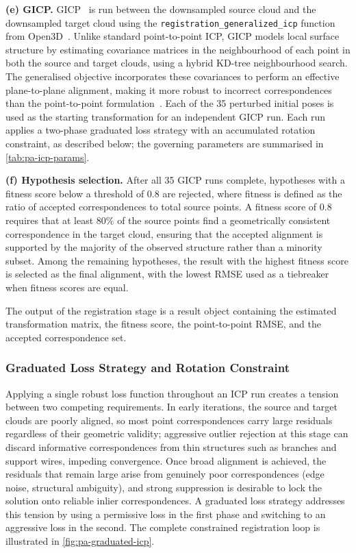 \textbf{(e) GICP.} GICP~\cite{segalGeneralizedICP2009} is run between the downsampled source cloud and the downsampled target cloud using the \texttt{registration\_generalized\_icp} function from Open3D~\cite{zhouOpen3DModernLibrary2018}. Unlike standard point-to-point ICP, GICP models local surface structure by estimating covariance matrices in the neighbourhood of each point in both the source and target clouds, using a hybrid KD-tree neighbourhood search. The generalised objective incorporates these covariances to perform an effective plane-to-plane alignment, making it more robust to incorrect correspondences than the point-to-point formulation~\cite{segalGeneralizedICP2009}. Each of the 35 perturbed initial poses is used as the starting transformation for an independent GICP run. Each run applies a two-phase graduated loss strategy with an accumulated rotation constraint, as described below; the governing parameters are summarised in \cref{tab:pa-icp-params}.

\textbf{(f) Hypothesis selection.} After all 35 GICP runs complete, hypotheses with a fitness score below a threshold of 0.8 are rejected, where fitness is defined as the ratio of accepted correspondences to total source points. A fitness score of 0.8 requires that at least 80\% of the source points find a geometrically consistent correspondence in the target cloud, ensuring that the accepted alignment is supported by the majority of the observed structure rather than a minority subset. Among the remaining hypotheses, the result with the highest fitness score is selected as the final alignment, with the lowest RMSE used as a tiebreaker when fitness scores are equal.

The output of the registration stage is a result object containing the estimated transformation matrix, the fitness score, the point-to-point RMSE, and the accepted correspondence set.

\subsubsection*{Graduated Loss Strategy and Rotation Constraint}
\label{subsubsec:pa-graduated-icp}

Applying a single robust loss function throughout an ICP run creates a tension between two competing requirements. In early iterations, the source and target clouds are poorly aligned, so most point correspondences carry large residuals regardless of their geometric validity; aggressive outlier rejection at this stage can discard informative correspondences from thin structures such as branches and support wires, impeding convergence. Once broad alignment is achieved, the residuals that remain large arise from genuinely poor correspondences (edge noise, structural ambiguity), and strong suppression is desirable to lock the solution onto reliable inlier correspondences. A graduated loss strategy addresses this tension by using a permissive loss in the first phase and switching to an aggressive loss in the second. The complete constrained registration loop is illustrated in \cref{fig:pa-graduated-icp}.

